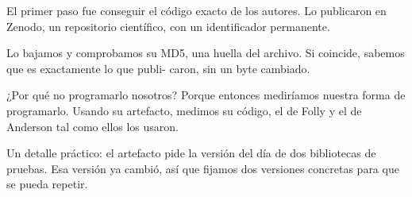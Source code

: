 El primer paso fue conseguir el código exacto de los autores. Lo publicaron en Zenodo, un repositorio científico, con un identificador permanente.

Lo bajamos y comprobamos su MD5, una huella del archivo. Si coincide, sabemos que es exactamente lo que publi- caron, sin un byte cambiado.

¿Por qué no programarlo nosotros? Porque entonces mediríamos nuestra forma de programarlo. Usando su artefacto, medimos su código, el de Folly y el de Anderson tal como ellos los usaron.

Un detalle práctico: el artefacto pide la versión del día de dos bibliotecas de pruebas. Esa versión ya cambió, así que fijamos dos versiones concretas para que se pueda repetir.
